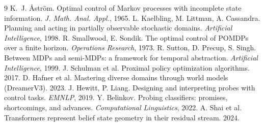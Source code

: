 \documentclass[11pt]{article}
\begin{document}
\begin{thebibliography}{9}
\small
{} K.~J. \AA str\"om. Optimal control of Markov processes with
incomplete state information. \emph{J. Math. Anal. Appl.}, 1965.
 L. Kaelbling, M. Littman, A. Cassandra. Planning and acting in
partially observable stochastic domains. \emph{Artificial Intelligence}, 1998.
 R. Smallwood, E. Sondik. The optimal control of POMDPs over a finite
horizon. \emph{Operations Research}, 1973.
 R. Sutton, D. Precup, S. Singh. Between MDPs and semi-MDPs: a
framework for temporal abstraction. \emph{Artificial Intelligence}, 1999.
 J. Schulman et al. Proximal policy optimization algorithms. 2017.
 D. Hafner et al. Mastering diverse domains through world models
(DreamerV3). 2023.
 J. Hewitt, P. Liang. Designing and interpreting probes with control
tasks. \emph{EMNLP}, 2019.
 Y. Belinkov. Probing classifiers: promises, shortcomings, and
advances. \emph{Computational Linguistics}, 2022.
 A. Shai et al. Transformers represent belief state geometry in their
residual stream. 2024.
\end{thebibliography}
\end{document}
